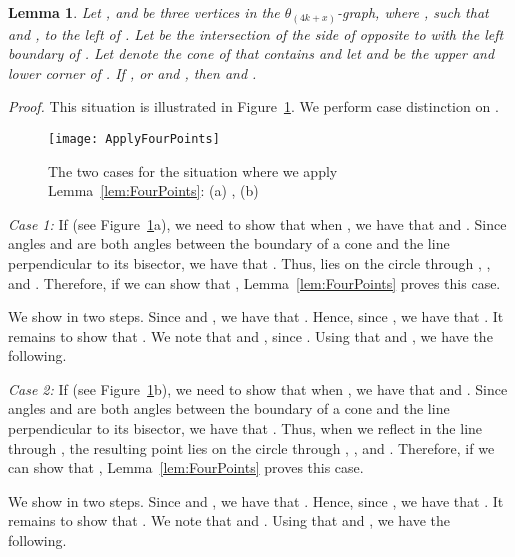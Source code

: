 \documentclass[12pt]{article}
\newtheorem{lem}[defin]{Lemma}
\newenvironment{lemma}{\begin{lem} \sl}{\end{lem}}
\newenvironment{proof}{\emph{Proof.}}{\hfill \\}
\newcommand{\graph}[1]{\ensuremath{\theta_{(4 k + #1)}}-graph\xspace}
\begin{document}
\begin{lemma}
  \label{lem:ApplyFourPoints} 
  Let ,  and  be three vertices in the \graph{x}, where , such that  and , to the left of . Let  be the intersection of the side of  opposite to  with the left boundary of . Let  denote the cone of  that contains  and let  and  be the upper and lower corner of . If , or  and , then  and .
\end{lemma}
\begin{proof}
  This situation is illustrated in Figure~\ref{fig:ApplyFourPoints}. We perform case distinction on  . 

  \begin{figure}[ht]
    \begin{center}
      \texttt{[image: ApplyFourPoints]}
    \end{center}
    \caption{The two cases for the situation where we apply Lemma~\ref{lem:FourPoints}: (a) , \mbox{(b) }}
    \label{fig:ApplyFourPoints}
  \end{figure}

  \textit{Case 1:} If  (see Figure~\ref{fig:ApplyFourPoints}a), we need to show that when , we have that  and . Since angles  and  are both angles between the boundary of a cone and the line perpendicular to its bisector, we have that . Thus,  lies on the circle through , , and . Therefore, if we can show that , Lemma~\ref{lem:FourPoints} proves this case. 

  We show  in two steps. Since  and , we have that . Hence, since , we have that . It remains to show that . We note that  and , since . Using that  and , we have the following. 
  

  \textit{Case 2:} If  (see Figure~\ref{fig:ApplyFourPoints}b), we need to show that when , we have that  and . Since angles  and  are both angles between the boundary of a cone and the line perpendicular to its bisector, we have that . Thus, when we reflect  in the line through , the resulting point  lies on the circle through , , and . Therefore, if we can show that , Lemma~\ref{lem:FourPoints} proves this case. 

  We show  in two steps. Since  and , we have that . Hence, since , we have that . It remains to show that . We note that  and . Using that  and , we have the following. 
   
\end{proof}
\end{document}
